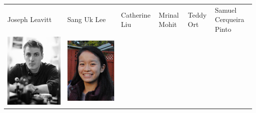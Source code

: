 \documentclass[landscape,a0paper,fontscale=0.292]{baposter}
\begin{document}
\begin{poster}
{\begin{center}
\begin{tabularx}{\linewidth}{X X X X X X}
{\tiny \centering Joseph Leavitt }& {\tiny \centering Sang Uk Lee }& {\tiny \centering Catherine Liu }& {\tiny \centering Mrinal Mohit }& {\tiny \centering Teddy Ort }& {\tiny \centering Samuel Cerqueira Pinto }\\ 
 {\centering \includegraphics[width=0.6\linewidth]{tristan.jpg}}&
{\centering \includegraphics[width=0.6\linewidth]{jenshen.jpg}}&

\end{tabularx}
\end{center}}
\end{poster}
\end{document}
